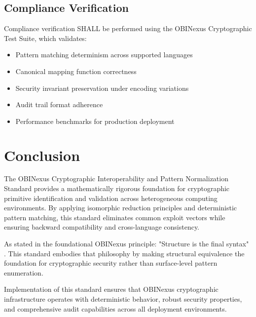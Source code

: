 \documentclass[11pt,a4paper]{article}
\begin{document}
\subsection{Compliance Verification}

Compliance verification SHALL be performed using the OBINexus Cryptographic Test Suite, which validates:

\begin{itemize}
    \item Pattern matching determinism across supported languages
    \item Canonical mapping function correctness
    \item Security invariant preservation under encoding variations
    \item Audit trail format adherence
    \item Performance benchmarks for production deployment
\end{itemize}

\section{Conclusion}

The OBINexus Cryptographic Interoperability and Pattern Normalization Standard provides a mathematically rigorous foundation for cryptographic primitive identification and validation across heterogeneous computing environments. By applying isomorphic reduction principles and deterministic pattern matching, this standard eliminates common exploit vectors while ensuring backward compatibility and cross-language consistency.

As stated in the foundational OBINexus principle: "Structure is the final syntax" \cite{okpala2025isomorphic}. This standard embodies that philosophy by making structural equivalence the foundation for cryptographic security rather than surface-level pattern enumeration.

Implementation of this standard ensures that OBINexus cryptographic infrastructure operates with deterministic behavior, robust security properties, and comprehensive audit capabilities across all deployment environments.
\end{document}
